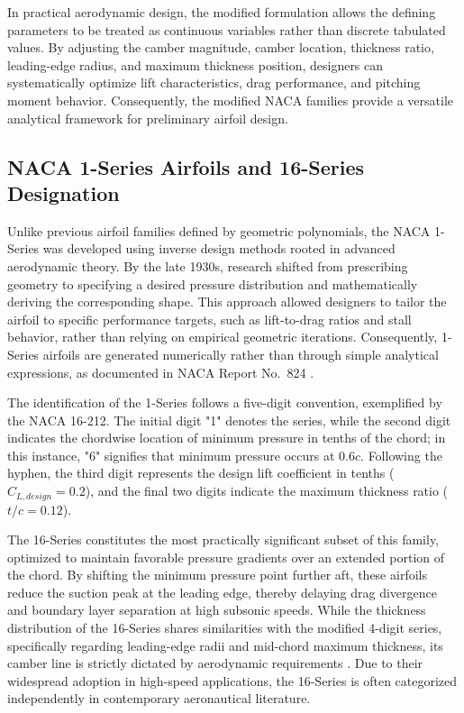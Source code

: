 In practical aerodynamic design, the modified formulation allows 
the defining parameters to be treated as continuous variables 
rather than discrete tabulated values.
By adjusting the camber magnitude, camber location, thickness ratio, 
leading-edge radius, and maximum thickness position, designers 
can systematically optimize lift characteristics, drag performance, 
and pitching moment behavior.
Consequently, the modified NACA families provide a versatile 
analytical framework for preliminary airfoil design.


\subsection*{NACA 1-Series Airfoils and 16-Series Designation}

Unlike previous airfoil families defined by geometric polynomials, the NACA 1-Series was developed using inverse design methods rooted in advanced aerodynamic theory. 
By the late 1930s, research shifted from prescribing geometry to specifying a desired pressure distribution and mathematically deriving the corresponding shape. This approach allowed designers to tailor the airfoil to specific performance targets, such as lift-to-drag ratios and stall behavior, rather than relying on empirical geometric iterations. 
Consequently, 1-Series airfoils are generated numerically rather than through simple analytical expressions, as documented in NACA Report No.~824 \cite{NACA_TR_824}.

The identification of the 1-Series follows a five-digit convention, exemplified by the NACA 16-212. 
The initial digit "1" denotes the series, while the second digit indicates the chordwise location of minimum pressure in tenths of the chord; in this instance, "6" signifies that minimum pressure occurs at $0.6c$. Following the hyphen, the third digit represents the design lift coefficient in tenths ($C_{L,design}=0.2$), and the final two digits indicate the maximum thickness ratio ($t/c=0.12$).

The 16-Series constitutes the most practically significant subset of this family, optimized to maintain favorable pressure gradients over an extended portion of the chord. 
By shifting the minimum pressure point further aft, these airfoils reduce the suction peak at the leading edge, thereby delaying drag divergence and boundary layer separation at high subsonic speeds. 
While the thickness distribution of the 16-Series shares similarities with the modified 4-digit series, specifically regarding leading-edge radii and mid-chord maximum thickness, its camber line is strictly dictated by aerodynamic requirements \cite{NACA_TR_492}. 
Due to their widespread adoption in high-speed applications, the 16-Series is often categorized independently in contemporary aeronautical literature.

